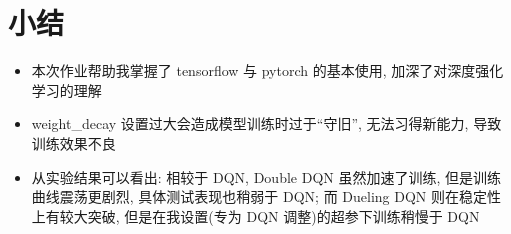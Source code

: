 \documentclass[a4paper,12pt]{article}
\begin{document}
\section{小结}
\begin{itemize}
    \item 本次作业帮助我掌握了 tensorflow 与 pytorch 的基本使用, 加深了对深度强化学习的理解
    \item weight\_decay 设置过大会造成模型训练时过于“守旧”, 无法习得新能力, 导致训练效果不良
    \item 从实验结果可以看出: 相较于 DQN, Double DQN 虽然加速了训练, 但是训练曲线震荡更剧烈, 具体测试表现也稍弱于 DQN; 而 Dueling DQN 则在稳定性上有较大突破, 但是在我设置(专为 DQN 调整)的超参下训练稍慢于 DQN
\end{itemize}
\end{document}
